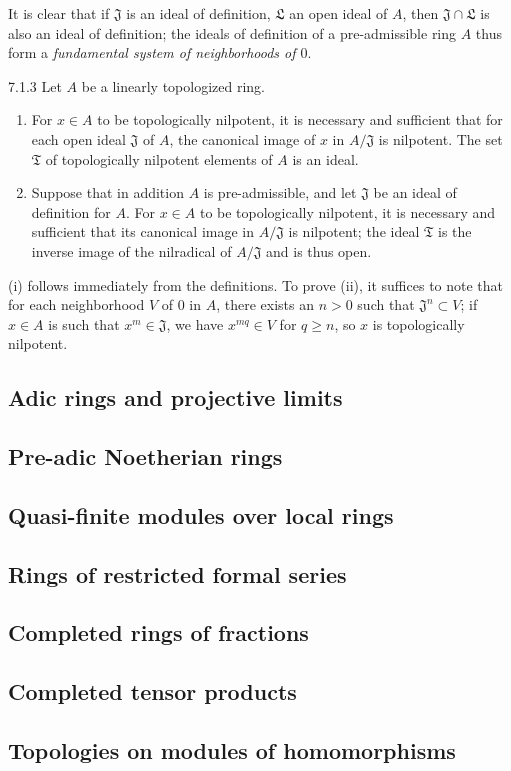 It is clear that if $\mathfrak{J}$ is an ideal of definition, $\mathfrak{L}$ an open ideal of
$A$, then $\mathfrak{J}\cap\mathfrak{L}$ is also an ideal of definition; the ideals of
definition of a pre-admissible ring $A$ thus form a \emph{fundamental system of neighborhoods
of $0$}.

\begin{envs}[Lemma]{7.1.3}
\label{lem-0.7.1.3}
Let $A$ be a linearly topologized ring.
\begin{enumerate}[label=\rm{(\roman*)}]
  \item For $x\in A$ to be topologically nilpotent, it is necessary and sufficient that for
        each open ideal $\mathfrak{J}$ of $A$, the canonical image of $x$ in $A/\mathfrak{J}$
        is nilpotent. The set $\mathfrak{T}$ of topologically nilpotent elements of $A$ is an
        ideal.
  \item Suppose that in addition $A$ is pre-admissible, and let $\mathfrak{J}$ be an ideal of
        definition for $A$. For $x\in A$ to be topologically nilpotent, it is necessary and
        sufficient that its canonical image in $A/\mathfrak{J}$ is nilpotent; the ideal
        $\mathfrak{T}$ is the inverse image of the nilradical of $A/\mathfrak{J}$ and is thus
        open.
\end{enumerate}
\end{envs}

(i) follows immediately from the definitions. To prove (ii), it suffices to note that for
each neighborhood $V$ of $0$ in $A$, there exists an $n>0$ such that
$\mathfrak{J}^n\subset V$; if $x\in A$ is such that $x^m\in\mathfrak{J}$, we have
$x^{mq}\in V$ for $q\geqslant n$, so $x$ is topologically nilpotent.


\subsection{Adic rings and projective limits}
\label{0-prelim-7.2}

\subsection{Pre-adic Noetherian rings}
\label{0-prelim-7.3}

\subsection{Quasi-finite modules over local rings}
\label{0-prelim-7.4}

\subsection{Rings of restricted formal series}
\label{0-prelim-7.5}

\subsection{Completed rings of fractions}
\label{0-prelim-7.6}

\subsection{Completed tensor products}
\label{0-prelim-7.7}

\subsection{Topologies on modules of homomorphisms}
\label{0-prelim-7.8}
